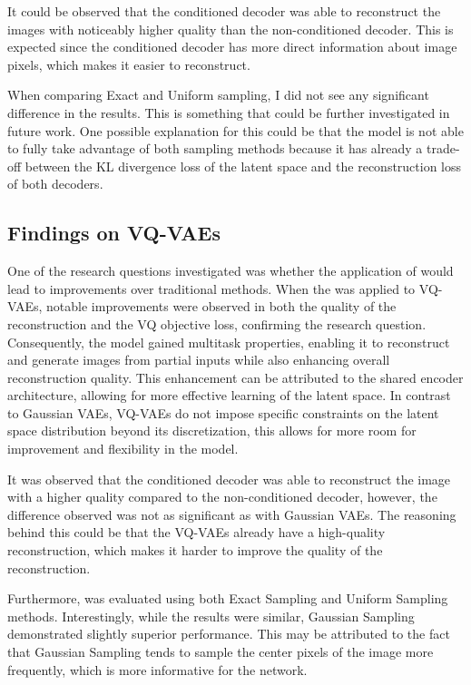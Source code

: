 It could be observed that the conditioned decoder was able to reconstruct the images with noticeably higher quality than the non-conditioned decoder. This is expected since the conditioned decoder has more direct information about image pixels, which makes it easier to reconstruct.  

When comparing Exact and Uniform sampling, I did not see any significant difference in the results. This is something that could be further investigated in future work. One possible explanation for this could be that the model is not able to fully take advantage of both sampling methods because it has already a trade-off between the KL divergence loss of the latent space and the reconstruction loss of both decoders.

\subsection{Findings on VQ-VAEs}

One of the research questions investigated was whether the application of  would lead to improvements over traditional methods. When the  was applied to VQ-VAEs, notable improvements were observed in both the quality of the reconstruction and the VQ objective loss, confirming the research question. Consequently, the model gained multitask properties, enabling it to reconstruct and generate images from partial inputs while also enhancing overall reconstruction quality. This enhancement can be attributed to the shared encoder architecture, allowing for more effective learning of the latent space. In contrast to Gaussian VAEs, VQ-VAEs do not impose specific constraints on the latent space distribution beyond its discretization, this allows for more room for improvement and flexibility in the model.

It was observed that the conditioned decoder was able to reconstruct the image with a higher quality compared to the non-conditioned decoder, however, the difference observed was not as significant as with Gaussian VAEs. The reasoning behind this could be that the VQ-VAEs already have a high-quality reconstruction, which makes it harder to improve the quality of the reconstruction.

Furthermore,  was evaluated using both Exact Sampling and Uniform Sampling methods. Interestingly, while the results were similar, Gaussian Sampling demonstrated slightly superior performance. This may be attributed to the fact that Gaussian Sampling tends to sample the center pixels of the image more frequently, which is more informative for the network.


